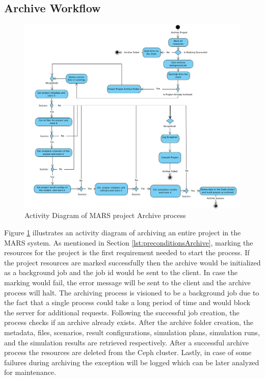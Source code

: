 \subsection{Archive Workflow}
\begin{figure}[H]
    \centering \includegraphics[scale=0.45]{grafiken/archiveActivity.png}
    \caption{Activity Diagram of MARS project Archive process}
    \label{fig:archiveActivity}
\end{figure}

Figure \ref{fig:archiveActivity} illustrates an activity diagram of archiving an entire project in the MARS system. As mentioned in Section \ref{lst:preconditionsArchive},
marking the resources for the project is the first requirement needed to start the process. If the project resources are marked successfully
then the archive would be initialized as a background job and the job id would be sent to the client. In case the marking would fail, the error message will be 
sent to the client and the archive process will halt. The archiving process is visioned to be a background job due to the fact that a single process could take
a long period of time and would block the server for additional requests. Following the successful job creation, the process checks if an archive already
exists. After
the archive folder creation, the metadata, files, scenarios, result configurations, simulation plans, simulation runs, and the simulation results are retrieved respectively.
After a successful archive process the  resources are deleted from the Ceph cluster. Lastly, in case of some failures during archiving the exception will be logged 
which can be later analyzed for maintenance.

